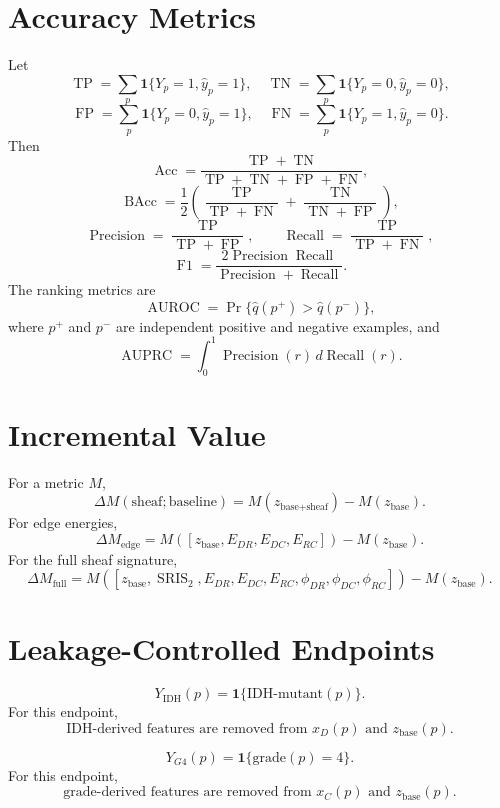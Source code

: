 \documentclass[11pt]{article}
\newcommand{\SRIS}{\operatorname{SRIS}}
\newcommand{\AUC}{\operatorname{AUROC}}
\newcommand{\AUPRC}{\operatorname{AUPRC}}
\newcommand{\Acc}{\operatorname{Acc}}
\newcommand{\BAcc}{\operatorname{BAcc}}
\newcommand{\Fone}{\operatorname{F1}}
\begin{document}
\section{Accuracy Metrics}

Let
\[
\operatorname{TP}=\sum_p\mathbf 1\{Y_p=1,\widehat y_p=1\},\quad
\operatorname{TN}=\sum_p\mathbf 1\{Y_p=0,\widehat y_p=0\},
\]
\[
\operatorname{FP}=\sum_p\mathbf 1\{Y_p=0,\widehat y_p=1\},\quad
\operatorname{FN}=\sum_p\mathbf 1\{Y_p=1,\widehat y_p=0\}.
\]
Then
\[
\Acc=\frac{\operatorname{TP}+\operatorname{TN}}{\operatorname{TP}+\operatorname{TN}+\operatorname{FP}+\operatorname{FN}},
\]
\[
\BAcc=\frac{1}{2}\left(
\frac{\operatorname{TP}}{\operatorname{TP}+\operatorname{FN}}
+
\frac{\operatorname{TN}}{\operatorname{TN}+\operatorname{FP}}
\right),
\]
\[
\operatorname{Precision}=\frac{\operatorname{TP}}{\operatorname{TP}+\operatorname{FP}},
\qquad
\operatorname{Recall}=\frac{\operatorname{TP}}{\operatorname{TP}+\operatorname{FN}},
\]
\[
\Fone=\frac{2\operatorname{Precision}\operatorname{Recall}}{\operatorname{Precision}+\operatorname{Recall}}.
\]
The ranking metrics are
\[
\AUC=\Pr\{\widehat q(p^+) > \widehat q(p^-)\},
\]
where $p^+$ and $p^-$ are independent positive and negative examples, and
\[
\AUPRC=\int_0^1 \operatorname{Precision}(r)\,d\operatorname{Recall}(r).
\]

\section{Incremental Value}

For a metric $M$,
\[
\Delta M(\text{sheaf};\text{baseline})
=
M(z_{\text{base}+\text{sheaf}})-M(z_{\text{base}}).
\]
For edge energies,
\[
\Delta M_{\text{edge}}
=
M([z_{\text{base}},E_{DR},E_{DC},E_{RC}])-M(z_{\text{base}}).
\]
For the full sheaf signature,
\[
\Delta M_{\text{full}}
=
M([z_{\text{base}},\SRIS_2,E_{DR},E_{DC},E_{RC},\phi_{DR},\phi_{DC},\phi_{RC}])-M(z_{\text{base}}).
\]

\section{Leakage-Controlled Endpoints}

\[
Y_{\operatorname{IDH}}(p)=\mathbf 1\{\text{IDH-mutant}(p)\}.
\]
For this endpoint,
\[
\text{IDH-derived features are removed from }x_D(p)\text{ and }z_{\text{base}}(p).
\]

\[
Y_{G4}(p)=\mathbf 1\{\text{grade}(p)=4\}.
\]
For this endpoint,
\[
\text{grade-derived features are removed from }x_C(p)\text{ and }z_{\text{base}}(p).
\]
\end{document}
